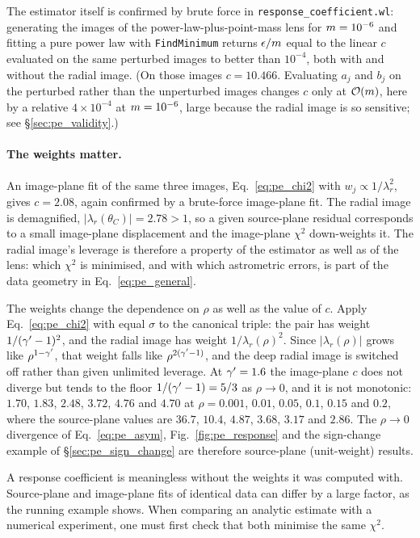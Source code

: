 The estimator itself is confirmed by brute force in
\texttt{response\_coefficient.wl}: generating the images of the
power-law-plus-point-mass lens for $m=10^{-6}$ and fitting a pure
power law with \texttt{FindMinimum} returns $\epsilon/m$ equal to the
linear $c$ evaluated on the same perturbed images to better than
$10^{-4}$, both with and without the radial image. (On those images
$c=10.466$. Evaluating $a_j$ and $b_j$ on the perturbed rather than the
unperturbed images changes $c$ only at $\mathcal{O}\!\left(m\right)$, here by a
relative $4\times10^{-4}$ at $m=10^{-6}$, large because the radial image is so
sensitive; see \S\ref{sec:pe_validity}.)

\paragraph{The weights matter.} An image-plane fit of the same three
images, Eq.~\eqref{eq:pe_chi2} with $w_j\propto1/\lambda_r^2$,
gives $c=2.08$, again confirmed by a brute-force image-plane fit. The
radial image is demagnified, $|\lambda_r(\theta_C)|=2.78>1$, so a
given source-plane residual corresponds to a small image-plane
displacement and the image-plane $\chi^2$ down-weights it. The radial
image's leverage is therefore a property of the estimator as well
as of the lens: which $\chi^2$ is minimised, and with which astrometric
errors, is part of the data geometry in Eq.~\eqref{eq:pe_general}.

The weights change the dependence on $\rho$ as well as the value of
$c$. Apply Eq.~\eqref{eq:pe_chi2} with equal $\sigma$ to the canonical
triple: the pair has weight $1/(\gamma'-1)^2$, and the radial image has weight
$1/\lambda_r(\rho)^2$. Since $|\lambda_r(\rho)|$ grows like
$\rho^{1-\gamma'}$, that weight falls like $\rho^{2(\gamma'-1)}$, and the deep
radial image is switched off rather than given unlimited leverage.
At $\gamma'=1.6$ the image-plane $c$ does not diverge but tends to the floor
$1/(\gamma'-1)=5/3$ as $\rho\to0$, and it is not monotonic: $1.70$, $1.83$,
$2.48$, $3.72$, $4.76$ and $4.70$ at $\rho=0.001$, $0.01$, $0.05$,
$0.1$, $0.15$ and $0.2$, where the source-plane values are $36.7$,
$10.4$, $4.87$, $3.68$, $3.17$ and $2.86$. The $\rho\to0$ divergence
of Eq.~\eqref{eq:pe_asym}, Fig.~\ref{fig:pe_response} and the sign-change
example of \S\ref{sec:pe_sign_change} are therefore source-plane
(unit-weight) results.

\begin{annotation}
A response coefficient is meaningless without the weights it was
computed with. Source-plane and image-plane fits of identical data can
differ by a large factor, as the running example shows. When comparing
an analytic estimate with a numerical experiment, one must first check
that both minimise the same $\chi^2$.
\end{annotation}

